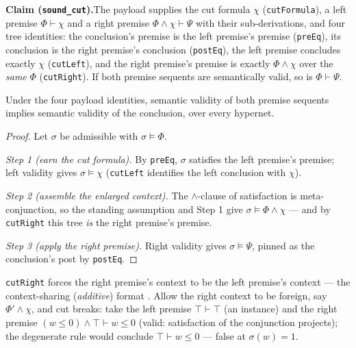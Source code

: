 

\textbf{Claim (\texttt{sound\_cut}).}\enspace The payload supplies the
cut formula $\chi$ (\texttt{cutFormula}), a left premise
$\Phi \vdash \chi$ and a right premise $\Phi \wedge \chi \vdash \Psi$
with their sub-derivations, and four tree identities: the conclusion's
premise is the left premise's premise (\texttt{preEq}), its conclusion
is the right premise's conclusion (\texttt{postEq}), the left premise
concludes exactly $\chi$ (\texttt{cutLeft}), and the right premise's
premise is exactly $\Phi \wedge \chi$ over the \emph{same} $\Phi$
(\texttt{cutRight}). If both premise sequents are semantically valid,
so is $\Phi \vdash \Psi$.

\begin{bthm}\label{thm:cut-sound}
Under the four payload identities, semantic validity of both premise
sequents implies semantic validity of the conclusion, over every
hypernet.
\end{bthm}
\begin{proof}
Let $\sigma$ be admissible with $\sigma \models \Phi$.

\emph{Step 1 (earn the cut formula).} By \texttt{preEq}, $\sigma$
satisfies the left premise's premise; left validity gives
$\sigma \models \chi$ (\texttt{cutLeft} identifies the left conclusion
with $\chi$).

\emph{Step 2 (assemble the enlarged context).} The $\wedge$-clause of
satisfaction is meta-conjunction, so the standing assumption and Step 1
give $\sigma \models \Phi \wedge \chi$ --- and by \texttt{cutRight} this tree
\emph{is} the right premise's premise.

\emph{Step 3 (apply the right premise).} Right validity gives
$\sigma \models \Psi$, pinned as the conclusion's post by
\texttt{postEq}.
\end{proof}

\begin{bremark}\label{rem:cut-sharing}
\texttt{cutRight} forces the right premise's context to be the left
premise's context --- the context-sharing (\emph{additive}) format
\cite{girard1987}. Allow the right context to be foreign, say
$\Phi' \wedge \chi$, and cut breaks: take the left premise
$\top \vdash \top$ (an  instance) and the right premise
$(w \leq 0) \wedge \top \vdash w \leq 0$ (valid: satisfaction of the
conjunction projects); the degenerate rule would conclude
$\top \vdash w \leq 0$ --- false at $\sigma(w) = 1$.
\end{bremark}

